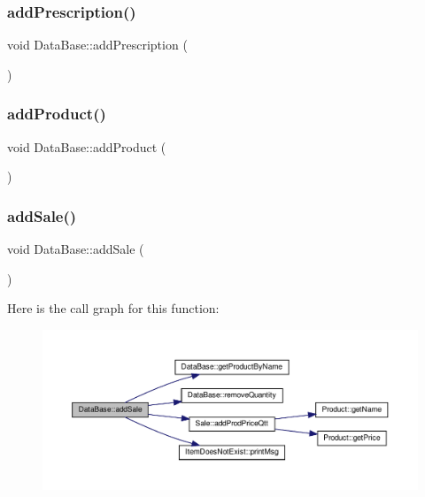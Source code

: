 \subsubsection{\texorpdfstring{add\+Prescription()}{addPrescription()}}
{\footnotesize\ttfamily void Data\+Base\+::add\+Prescription (\begin{DoxyParamCaption}{ }\end{DoxyParamCaption})}

\mbox{\label{classDataBase_a654216132c946bdb05ec4ae866302259}} 
\subsubsection{\texorpdfstring{add\+Product()}{addProduct()}}
{\footnotesize\ttfamily void Data\+Base\+::add\+Product (\begin{DoxyParamCaption}{ }\end{DoxyParamCaption})}

\mbox{\label{classDataBase_a0fb00cab402248ffba3903cc1f19f6c2}} 
\subsubsection{\texorpdfstring{add\+Sale()}{addSale()}}
{\footnotesize\ttfamily void Data\+Base\+::add\+Sale (\begin{DoxyParamCaption}{ }\end{DoxyParamCaption})}

Here is the call graph for this function\+:\nopagebreak
\begin{figure}[H]
\begin{center}
\leavevmode
\includegraphics[width=350pt]{classDataBase_a0fb00cab402248ffba3903cc1f19f6c2_cgraph}
\end{center}
\end{figure}
\mbox{\label{classDataBase_aed28994adfb33442ffd3469496150da8}} 
